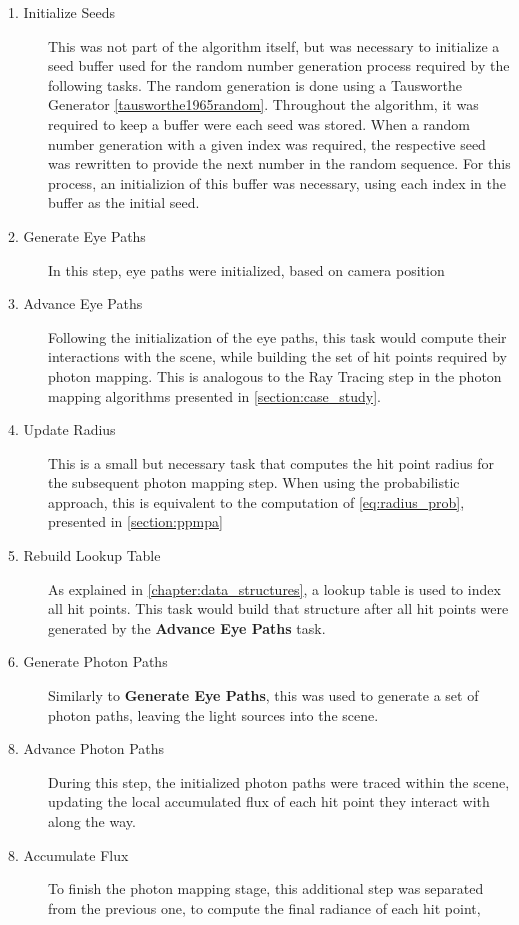 \documentclass[main.tex]{subfiles}
\begin{document}
\begin{description}

\item[1. Initialize Seeds] This was not part of the algorithm itself, but was necessary to initialize a seed buffer used for the random number generation process required by the following tasks. The random generation is done using a Tausworthe Generator \cref{tausworthe1965random}. Throughout the algorithm, it was required to keep a buffer were each seed was stored. When a random number generation with a given index was required, the respective seed was rewritten to provide the next number in the random sequence. For this process, an initializion of this buffer was necessary, using each index in the buffer as the initial seed.

\item[2. Generate Eye Paths] In this step, eye paths were initialized, based on camera position

\item[3. Advance Eye Paths] Following the initialization of the eye paths, this task would compute their interactions with the scene, while building the set of hit points required by photon mapping. This is analogous to the Ray Tracing step in the photon mapping algorithms presented in \cref{section:case_study}.

\item[4. Update Radius] This is a small but necessary task that computes the hit point radius for the subsequent photon mapping step. When using the probabilistic approach, this is equivalent to the computation of \cref{eq:radius_prob}, presented in \cref{section:ppmpa}

\item[5. Rebuild Lookup Table] As explained in \cref{chapter:data_structures}, a lookup table is used to index all hit points. This task would build that structure after all hit points were generated by the \textbf{Advance Eye Paths} task.

\item[6. Generate Photon Paths] Similarly to \textbf{Generate Eye Paths}, this was used to generate a set of photon paths, leaving the light sources into the scene.

\item[8. Advance Photon Paths] During this step, the initialized photon paths were traced within the scene, updating the local accumulated flux of each hit point they interact with along the way.

\item[8. Accumulate Flux] To finish the photon mapping stage, this additional step was separated from the previous one, to compute the final radiance of each hit point,


\end{description}
\end{document}
